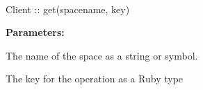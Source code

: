 %
%
%


\paragraph{}
\label{api:ruby:get}
\begin{rubycode}
Client :: get(spacename, key)
\end{rubycode}


\noindent\textbf{Parameters:}
\begin{description}[labelindent=\widthof{{\code{spacename}}},leftmargin=*,noitemsep,nolistsep,align=right]
\item[\code{spacename}] The name of the space as a string or symbol.
\item[\code{key}] The key for the operation as a Ruby type
\end{description}


